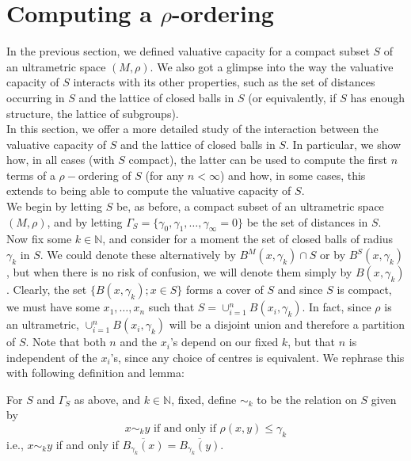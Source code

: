 

\newpage

\section*{Computing a $\rho$-ordering}
In the previous section, we defined valuative capacity for a compact subset $S$ of an ultrametric space $(M, \rho)$. We also got a glimpse into the way the valuative capacity of $S$ interacts with its other properties, such as the set of distances occurring in $S$ and the lattice of closed balls in $S$ (or equivalently, if $S$ has enough structure, the lattice of subgroups). \\

In this section, we offer a more detailed study of the interaction between the valuative capacity of $S$ and the lattice of closed balls in $S$. In particular, we  show how, in all cases (with $S$ compact), the latter can be used to compute the first $n$ terms of a $\rho-$ordering of $S$ (for any $n < \infty$) and how, in some cases, this extends to being able to compute the valuative capacity of $S$. \\

We begin by letting $S$ be, as before,  a compact subset of an ultrametric space $(M, \rho)$, and by letting $\Gamma_S =\{\gamma_0, \gamma_1,\ldots,\gamma_\infty=0\}$ be the set of distances in $S$.  Now fix some $k \in \mathbb{N}$, and consider for a moment the set of closed balls of radius $\gamma_k$ in $S$. We could denote these alternatively by $B^M(x, \gamma_k) \cap S$ or by  $B^S(x, \gamma_k)$, but when there is no risk of confusion, we will denote them simply by $B(x, \gamma_k)$. Clearly, the set  $\{B(x, \gamma_k); x \in S\}$ forms a cover of $S$ and since $S$ is compact, we must have some $x_1,\ldots, x_n$  such that $S= \cup_{i=1}^n B(x_i, \gamma_k)$. In fact,  since $\rho$ is an ultrametric, $\cup_{i=1}^n B(x_i, \gamma_k)$ will be a disjoint union and therefore a partition of $S$. Note that both $n$ and the $x_i$'s depend on our fixed $k$, but that $n$ is independent of the $x_i$'s, since any choice of centres is equivalent. We rephrase this with following definition and lemma:

\begin{definition*}
For $S$ and $\Gamma_S$ as above, and $k \in \mathbb{N}$, fixed,  define $\sim_k$ to  be the relation on $S$ given by \[x \sim_k y\text{ if and only if  }\rho(x,y) \leq \gamma_k\] i.e.,  $x \sim_k y$ if and only if $\overline{B_{\gamma_k}(x)} =\overline{B_{\gamma_k}(y)}$.
\end{definition*}

